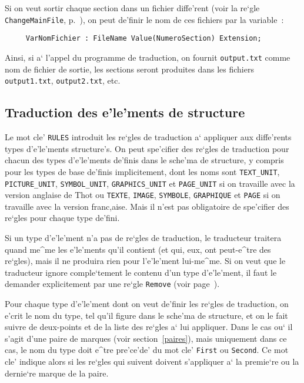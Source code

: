 {\begin{example}
Si on veut sortir chaque section dans un fichier diffe'rent (voir la
re`gle {\tt ChangeMainFile}, p.~\pageref{changemainfile}), on peut
de'finir le nom de ces fichiers par la variable~:
\label{varnomfichier}
\begin{verbatim}
     VarNomFichier : FileName Value(NumeroSection) Extension;
\end{verbatim}
Ainsi, si a` l'appel du programme de traduction, on fournit
{\tt output.txt} comme nom de fichier de sortie, les sections
seront produites dans les fichiers {\tt output1.txt},
{\tt output2.txt}, etc.
\end{example}

\subsection{Traduction des e'le'ments de structure}

Le mot cle' {\tt RULES} introduit les re`gles de traduction a` appliquer aux
diffe'rents types d'e'le'ments structure's. On peut spe'cifier des re`gles de
traduction pour chacun des types d'e'le'ments de'finis dans le sche'ma de
structure, y compris pour les types de base de'finis implicitement, dont les
noms sont {\tt TEXT\_UNIT}, {\tt PICTURE\_UNIT}, {\tt SYMBOL\_UNIT},
{\tt GRAPHICS\_UNIT} et {\tt PAGE\_UNIT} si on travaille avec la version
anglaise de Thot ou {\tt TEXTE}, {\tt IMAGE}, {\tt SYMBOLE}, {\tt GRAPHIQUE}
et {\tt PAGE} 
si on travaille avec la version franc,aise. Mais il n'est pas obligatoire de
spe'cifier des re`gles pour chaque type de'fini.

Si un type d'e'le'ment n'a pas de re`gles de traduction, le traducteur
traitera quand me^me les e'le'ments qu'il contient (et qui, eux, ont
peut-e^tre des re`gles), mais il ne produira rien pour l'e'le'ment lui-me^me.
Si on veut que le traducteur ignore comple`tement le contenu d'un type
d'e'le'ment, il faut le demander explicitement par une re`gle {\tt Remove}
(voir page~\pageref{remove}).

Pour chaque type d'e'le'ment dont on veut de'finir les re`gles de traduction,
on e'crit le nom du type, tel qu'il figure dans le sche'ma de structure, et
on le fait suivre de deux-points et de la liste des re`gles a` lui appliquer.
Dans le cas ou` il s'agit d'une paire de marques (voir section~\ref{paires}),
mais uniquement dans ce cas, le nom du type doit e^tre pre'ce'de' du mot cle'
{\tt First} ou {\tt Second}. Ce mot cle' indique alors si les re`gles qui
suivent doivent s'appliquer a` la premie`re ou la dernie`re marque de la paire.

}
